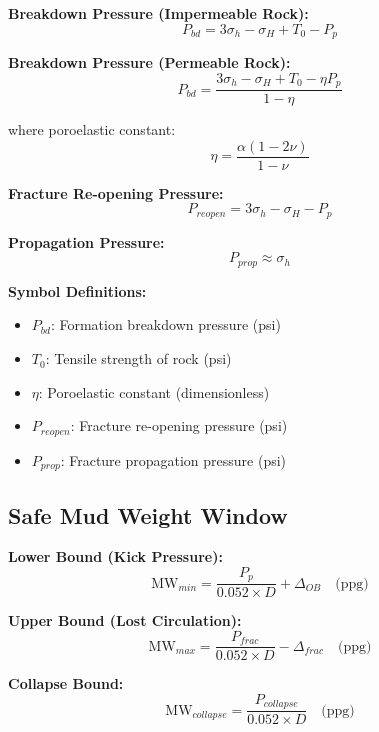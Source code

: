 \documentclass[11pt,a4paper]{article}
\newcommand{\symitem}[2]{\item \textbf{#1}: #2}
\begin{document}
\begin{tcolorbox}[colback=formulabox,colframe=black!75]
\textbf{Breakdown Pressure (Impermeable Rock):}
\begin{equation}
P_{bd} = 3\sigma_h - \sigma_H + T_0 - P_p
\end{equation}

\textbf{Breakdown Pressure (Permeable Rock):}
\begin{equation}
P_{bd} = \frac{3\sigma_h - \sigma_H + T_0 - \eta P_p}{1 - \eta}
\end{equation}

where poroelastic constant:
\begin{equation}
\eta = \frac{\alpha(1-2\nu)}{1-\nu}
\end{equation}

\textbf{Fracture Re-opening Pressure:}
\begin{equation}
P_{reopen} = 3\sigma_h - \sigma_H - P_p
\end{equation}

\textbf{Propagation Pressure:}
\begin{equation}
P_{prop} \approx \sigma_h
\end{equation}
\end{tcolorbox}

\textbf{Symbol Definitions:}
\begin{itemize}[leftmargin=2cm]
\symitem{$P_{bd}$}{Formation breakdown pressure (psi)}
\symitem{$T_0$}{Tensile strength of rock (psi)}
\symitem{$\eta$}{Poroelastic constant (dimensionless)}
\symitem{$P_{reopen}$}{Fracture re-opening pressure (psi)}
\symitem{$P_{prop}$}{Fracture propagation pressure (psi)}
\end{itemize}

\subsection{Safe Mud Weight Window}

\begin{tcolorbox}[colback=formulabox,colframe=black!75]
\textbf{Lower Bound (Kick Pressure):}
\begin{equation}
\text{MW}_{min} = \frac{P_p}{0.052 \times D} + \Delta_{OB} \quad \text{(ppg)}
\end{equation}

\textbf{Upper Bound (Lost Circulation):}
\begin{equation}
\text{MW}_{max} = \frac{P_{frac}}{0.052 \times D} - \Delta_{frac} \quad \text{(ppg)}
\end{equation}

\textbf{Collapse Bound:}
\begin{equation}
\text{MW}_{collapse} = \frac{P_{collapse}}{0.052 \times D} \quad \text{(ppg)}
\end{equation}
\end{tcolorbox}
\end{document}
